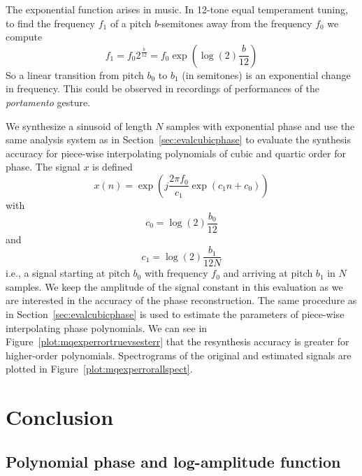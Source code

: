 The exponential function arises in music. In 12-tone equal temperament tuning,
to find the frequency $f_{1}$ of a pitch $b$-semitones away from the frequency
$f_{0}$ we compute
\[
    f_{1}=f_{0}2^{\frac{b}{12}}=f_{0}\exp(\log(2)\frac{b}{12})
\]
So a linear transition from pitch $b_{0}$ to $b_{1}$ (in semitones) is an
exponential change in frequency. This could be observed in recordings of
performances of the \textit{portamento} gesture.

We synthesize a sinusoid  of length $N$ samples with exponential phase and use
the same analysis system as in Section~\ref{sec:evalcubicphase} to evaluate the
synthesis accuracy for piece-wise interpolating polynomials of cubic and quartic
order for phase. The signal $x$ is defined
\[
    x(n) = \exp(j\frac{2\pi f_{0}}{c_{1}}\exp(c_{1}n + c_{0}))
\]
with
\[
    c_{0} = \log(2)\frac{b_{0}}{12}
\]
and
\[
    c_{1}= \log(2)\frac{b_{1}}{12N}
\]
i.e., a signal starting at pitch $b_{0}$ with frequency $f_{0}$ and arriving at
pitch $b_{1}$ in $N$ samples. We keep the amplitude of the signal constant in
this evaluation as we are interested in the accuracy of the phase
reconstruction. The same procedure as in
Section~\ref{sec:evalcubicphase} is used to estimate the parameters of
piece-wise interpolating phase polynomials. We can see in
Figure~\ref{plot:mqexperrortruevsesterr} that the resynthesis accuracy is
greater for higher-order polynomials. Spectrograms of the original and estimated
signals are plotted in Figure~\ref{plot:mqexperrorallspect}.

\section{Conclusion}

\subsection{Polynomial phase and log-amplitude function}

